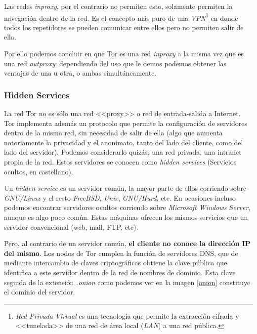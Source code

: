 \documentclass[a4paper, 11pt, titlepage]{article}
\begin{document}
        Las redes \emph{inproxy}, por el contrario no permiten esto, solamente permiten la navegación dentro de la red. Es 
        el concepto más puro de una \emph{VPN}\footnote{\emph{Red Privada Virtual} es una tecnología que permite la 
        extracción cifrada y <<tunelada>> de una red de área local (\emph{LAN}) a una red pública.} en donde todos los 
        repetidores se pueden comunicar entre ellos pero no permiten salir de ella.
        
        Por ello podemos concluir en que Tor es una red \emph{inproxy} a la misma vez que es una red \emph{outproxy}; 
        dependiendo del uso que le demos podemos obtener las ventajas de una u otra, o ambas simultáneamente.
    
        \subsubsection{Hidden Services}

            La red Tor no es sólo una red <<proxy>> o red de entrada-salida a Internet. Tor implementa además un protocolo 
            que permite la configuración de servidores dentro de la misma red, sin necesidad de salir de ella (algo que 
            aumenta notoriamente la privacidad y el anonimato, tanto del lado del cliente, como del lado del servidor). 
            Podemos considerarlo quizás, una red privada, una intranet propia de la red. Estos servidores se conocen como 
            \emph{hidden services} (Servicios ocultos, en castellano).
            
            Un \emph{hidden service} es un servidor común, la mayor parte de ellos corriendo sobre \emph{GNU/Linux} y 
            el resto \emph{FreeBSD}, \emph{Unix}, \emph{GNU/Hurd}, etc. En ocasiones incluso podemos encontrar servidores 
            ocultos corriendo sobre \emph{Microsoft Windows Server}, aunque es algo poco común. Estas máquinas ofrecen 
            los mismos servicios que un servidor convencional (web, mail, FTP, etc).
            
            Pero, al contrario de un servidor común, \textbf{el cliente no conoce la dirección IP del mismo}. Los nodos 
            de Tor cumplen la función de servidores DNS, que de mediante intercambio de claves criptográficas obtiene la 
            clave pública que identifica a este servidor dentro de la red de nombres de dominio. Esta clave seguida de la 
            extensión \emph{.onion} como podemos ver en la imagen \ref{onion} constituye el dominio del servidor.
        
\end{document}
